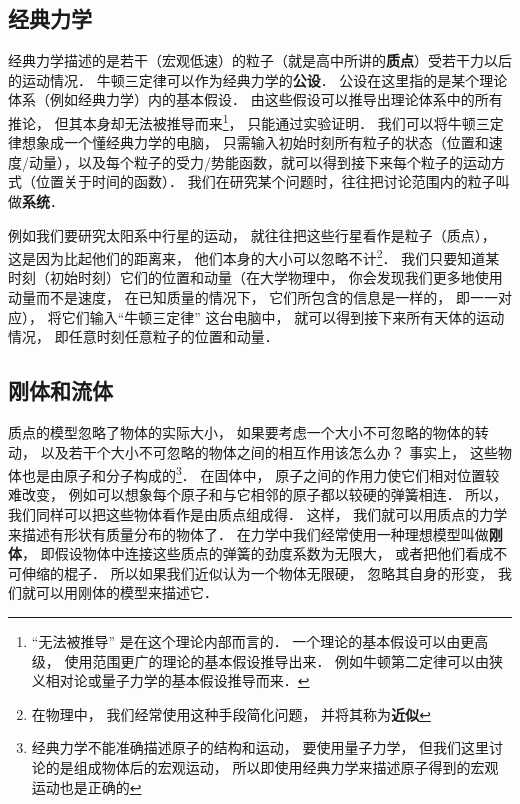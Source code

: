 

\subsection{经典力学}
经典力学描述的是若干（宏观低速）的粒子（就是高中所讲的\textbf{质点}）受若干力以后的运动情况． 牛顿三定律可以作为经典力学的\textbf{公设}． 公设在这里指的是某个理论体系（例如经典力学）内的基本假设． 由这些假设可以推导出理论体系中的所有推论， 但其本身却无法被推导而来\footnote{“无法被推导” 是在这个理论内部而言的． 一个理论的基本假设可以由更高级， 使用范围更广的理论的基本假设推导出来． 例如牛顿第二定律可以由狭义相对论或量子力学的基本假设推导而来．}， 只能通过实验证明． 我们可以将牛顿三定律想象成一个懂经典力学的电脑， 只需输入初始时刻所有粒子的状态（位置和速度/动量），以及每个粒子的受力/势能函数，就可以得到接下来每个粒子的运动方式（位置关于时间的函数）． 我们在研究某个问题时，往往把讨论范围内的粒子叫做\textbf{系统}．

例如我们要研究太阳系中行星的运动， 就往往把这些行星看作是粒子（质点）， 这是因为比起他们的距离来， 他们本身的大小可以忽略不计\footnote{在物理中， 我们经常使用这种手段简化问题， 并将其称为\textbf{近似}}． 我们只要知道某时刻（初始时刻）它们的位置和动量（在大学物理中， 你会发现我们更多地使用动量而不是速度， 在已知质量的情况下， 它们所包含的信息是一样的， 即一一对应）， 将它们输入“牛顿三定律” 这台电脑中， 就可以得到接下来所有天体的运动情况， 即任意时刻任意粒子的位置和动量．

\subsection{刚体和流体}
质点的模型忽略了物体的实际大小， 如果要考虑一个大小不可忽略的物体的转动， 以及若干个大小不可忽略的物体之间的相互作用该怎么办？ 事实上， 这些物体也是由原子和分子构成的\footnote{经典力学不能准确描述原子的结构和运动， 要使用量子力学， 但我们这里讨论的是组成物体后的宏观运动， 所以即使用经典力学来描述原子得到的宏观运动也是正确的}． 在固体中， 原子之间的作用力使它们相对位置较难改变， 例如可以想象每个原子和与它相邻的原子都以较硬的弹簧相连． 所以， 我们同样可以把这些物体看作是由质点组成得． 这样， 我们就可以用质点的力学来描述有形状有质量分布的物体了． 在力学中我们经常使用一种理想模型叫做\textbf{刚体}， 即假设物体中连接这些质点的弹簧的劲度系数为无限大， 或者把他们看成不可伸缩的棍子． 所以如果我们近似认为一个物体无限硬， 忽略其自身的形变， 我们就可以用刚体的模型来描述它．

